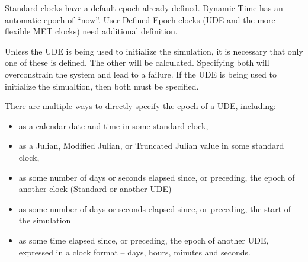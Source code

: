 Standard clocks have a default epoch already defined.  Dynamic Time has an
automatic epoch of ``now''.  User-Defined-Epoch clocks (UDE and the more
flexible MET clocks) need additional definition.

Unless the UDE is being used to initialize the simulation, it is necessary
that only one of these is defined.  The other will be calculated.
Specifying both will overconstrain the system and lead to a failure.  If
the UDE is being used to initialize the simualtion, then both must be
specified.

There are multiple ways to directly specify the epoch of a UDE, including:
\begin{itemize}
\item as a calendar date and time in some standard clock,
\item as a Julian, Modified Julian, or Truncated Julian value in some standard
clock,
\item as some number of days or seconds elapsed since, or preceding, the epoch
of another clock (Standard or another UDE)
\item as some number of days or seconds elapsed since, or preceding, the start
of the simulation
\item as some time elapsed since, or preceding, the epoch of another UDE,
expressed in a clock format -- days, hours, minutes and seconds.
\end{itemize}

